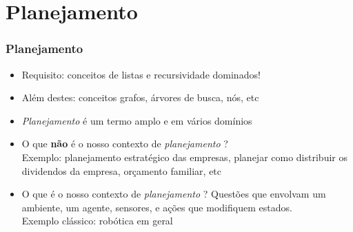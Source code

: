 \section{Planejamento}
\begin{frame}[fragile]

    \frametitle{Planejamento}

   \begin{block}{}
     \begin{itemize}
      \item Requisito: conceitos de listas e recursividade  dominados!
       \pause
      
      \item Além destes: conceitos grafos, árvores de busca, nós, etc
       
       \pause
      \item \textit{Planejamento} é um termo amplo e em vários domínios 
      
       \pause
      \item O que \textbf{não} é o nosso contexto de \textit{planejamento} ?\\
      Exemplo: planejamento estratégico das empresas, planejar como distribuir
      os dividendos da empresa, orçamento familiar,  etc
      
      \pause
      
      
      \item O que é o nosso contexto de \textit{planejamento} ?
       \pause
       Questões que envolvam um ambiente, um agente, sensores,
      e  ações que modifiquem estados.\\ Exemplo clássico:  robótica em geral
 

    \end{itemize}
    
    \end{block}
    
\end{frame}



